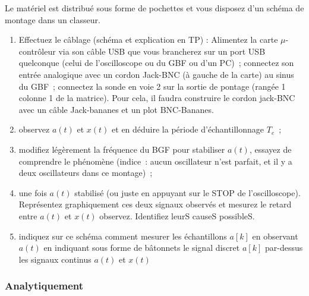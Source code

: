 \documentclass[a4paper,twoside,12pt]{report}           %
\begin{document}
Le matériel est distribué sous forme de pochettes et vous disposez
d'un schéma de montage dans un classeur.
\begin{enumerate}
\item Effectuez le câblage (schéma et explication en TP) : Alimentez
  la carte $\mu$-contrôleur via son câble USB que vous brancherez sur
  un port USB quelconque (celui de l'oscilloscope ou du GBF ou d'un
  PC)~; connectez son entrée analogique avec un cordon Jack-BNC (à
  gauche de la carte) au sinus du GBF~; connectez la sonde en voie 2
  sur la sortie de pontage (rangée 1 colonne 1 de la matrice). Pour
  cela, il faudra construire le cordon jack-BNC avec un câble
  Jack-bananes et un plot BNC-Bananes.
\item observez $a(t)$ et $x(t)$ et en déduire la période
  d'échantillonnage $T_e$~;
\item modifiez légèrement la fréquence du BGF pour stabiliser $a(t)$,
  essayez de comprendre le phénomène (indice~: aucun oscillateur n'est
  parfait, et il y a deux oscillateurs dans ce montage)~;
\item une fois $a(t)$ stabilisé (ou juste en appuyant sur le STOP de
  l'oscilloscope). Représentez graphiquement ces deux signaux observés
  et mesurez le retard entre $a(t)$ et $x(t)$ observez. Identifiez
  leurS causeS possibleS.
\item indiquez sur ce schéma comment mesurer les échantillons $a[k]$
  en observant $a(t)$ en indiquant sous forme de bâtonnets le signal
  discret $a[k]$ par-dessus les signaux continus $a(t)$ et $x(t)$
\end{enumerate}


\subsubsection{Analytiquement}
\end{document}
